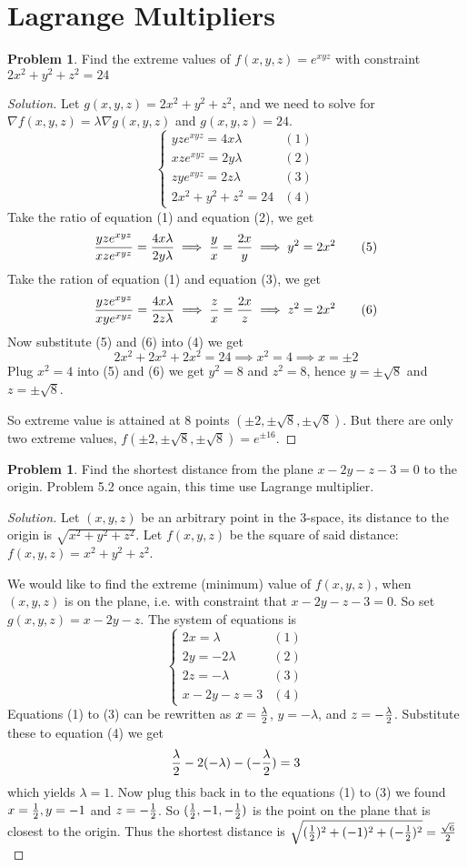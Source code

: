 \documentclass[12pt]{amsart}%
\theoremstyle{plain}
\theoremstyle{definition}
\newtheorem{prob}[theorem]{Problem}
\theoremstyle{special}
\newcommand{\sol}[1]{
{\begin{proof}[Solution]#1\end{proof}}
}
\newcommand{\Prob}[1]{\begin{tcolorbox}%
\begin{prob}
	#1
\end{prob}
\end{tcolorbox}	
}
\begin{document}
\section{Lagrange Multipliers}
\Prob{Find the extreme values of $f(x,y,z)=e^{xyz}$ with constraint $2x^2 +y^2 +z^2 =24$}
\sol{
Let $g(x,y,z)=2x^2+y^2+z^2$, and we need to solve for $\nabla f(x,y,z)=\lambda \nabla g(x,y,z)$ and $g(x,y,z)=24$.
\[\begin{cases}
yze^{xyz}=4x\lambda &(1)\\
xze^{xyz}=2y\lambda &(2)\\
zye^{xyz}=2z\lambda &(3)\\
	2x^2+y^2+z^2=24&(4)
\end{cases}
 \]
 Take the ratio of equation (1) and equation (2), we get
 \[{yze^{xyz}\over xze^{xyz}}={4x\lambda\over 2y\lambda}\implies {y\over x}={2x\over y}\implies y^2=2x^2\tag{5}\]
 Take the ration of equation (1) and equation (3), we get
 \[{yze^{xyz}\over xye^{xyz}}={4x\lambda\over 2z\lambda}\implies {z\over x}={2x\over z}\implies z^2=2x^2\tag{6}\]
 Now substitute (5) and (6) into (4) we get
 \[2x^2+2x^2+2x^2=24\implies x^2=4\implies x=\pm 2\]
 Plug $x^2=4$ into (5) and (6) we get
 \(y^2=8\) and $z^2=8$, hence $y=\pm \sqrt{8}$ and $z=\pm\sqrt{8}$.
 
 So extreme value is attained at 8 points $(\pm 2,\pm\sqrt{8},\pm\sqrt{8})$. But there are only two extreme values, $f(\pm 2,\pm\sqrt{8},\pm\sqrt{8})=e^{\pm 16}$.
}
\Prob{Find the shortest distance from the plane $x-2y-z-3=0$ to the origin. Problem 5.2 once again, this time use Lagrange multiplier.}
\sol{
Let $(x,y,z)$ be an arbitrary point in the $3$-space, its distance to the origin is $\sqrt{x^2+y^2+z^2}$. Let $f(x,y,z)$ be the square of said distance: $f(x,y,z)=x^2+y^2+z^2$.

We would like to find the extreme (minimum) value of $f(x,y,z)$, when $(x,y,z)$ is on the plane, i.e. with constraint that $x-2y-z-3=0$. So set $g(x,y,z)=x-2y-z$. The system of equations is
\[\begin{cases}
2x=\lambda &(1)\\
2y=-2\lambda &(2)\\
2z=-\lambda &(3)\\
x-2y-z=3&(4)
\end{cases}
\]
Equations (1) to (3) can be rewritten as $x={\lambda\over 2}$, $y=-\lambda$, and $z=-{\lambda\over 2}$. Substitute these to equation (4) we get
\[{\lambda\over 2}-2(-\lambda)-(-{\lambda\over 2})=3\]
which yields $\lambda=1$. Now plug this back in to the equations (1) to (3) we found $x={1\over 2},y=-1$ and $z=-{1\over 2}$. So $({1\over 2},-1,-{1\over 2})$ is the point on the plane that is closest to the origin. Thus the shortest distance is $\sqrt{({1\over 2})^2+(-1)^2+(-{1\over 2})^2}={\sqrt{6}\over 2}$
}
\end{document}
